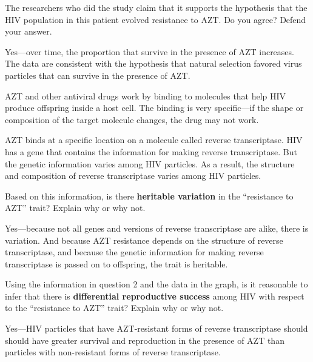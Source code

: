 \documentclass[11pt]{exam}
\begin{document}

\begin{questions}

\question
The researchers who did the study claim that it supports the hypothesis that
the HIV population in this patient evolved resistance to AZT. Do you agree?
Defend your answer.

\begin{solution}
    Yes---over time, the proportion that survive in the presence of AZT
    increases. The data are consistent with the hypothesis that natural
    selection favored virus particles that can survive in the presence of AZT.
\end{solution}


\question
AZT and other antiviral drugs work by binding to molecules that help HIV
produce offspring inside a host cell.  The binding is very specific---if the
shape or composition of the target molecule changes, the drug may not work.

AZT binds at a specific location on a molecule called reverse transcriptase.
HIV has a gene that contains the information for making reverse transcriptase.
But the genetic information varies among HIV particles. As a result, the
structure and composition of reverse transcriptase varies among HIV particles.

Based on this information, is there \textbf{heritable variation} in the
``resistance to AZT'' trait? Explain why or why not.

\begin{solution}
    Yes---because not all genes and versions of reverse transcriptase are
    alike, there is variation. And because AZT resistance depends on the
    structure of reverse transcriptase, and because the genetic information for
    making reverse transcriptase is passed on to offspring, the trait is
    heritable.
\end{solution}


\question
Using the information in question 2 and the data in the graph, is it reasonable
to infer that there is \textbf{differential reproductive success} among HIV
with respect to the ``resistance to AZT'' trait? Explain why or why not.

\begin{solution}
    Yes---HIV particles that have AZT-resistant forms of reverse transcriptase
    should should have greater survival and reproduction in the presence of AZT
    than particles with non-resistant forms of reverse transcriptase.
\end{solution}


\end{questions}
\end{document}
